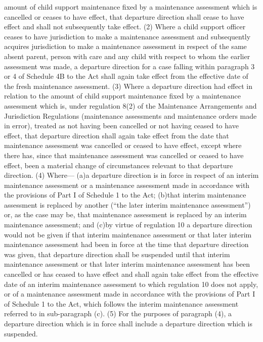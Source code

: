 \documentclass[a4paper]{article}
\begin{document}
amount of child support maintenance fixed by a maintenance assessment which is
cancelled or ceases to have effect, that departure direction shall cease to have
effect and shall not subsequently take effect.
(2) Where a child support officer ceases to have jurisdiction to make a
maintenance assessment and subsequently acquires jurisdiction to make a
maintenance assessment in respect of the same absent parent, person with care
and any child with respect to whom the earlier assessment was made, a departure
direction for a case falling within paragraph 3 or 4 of Schedule 4B to the Act
shall again take effect from the effective date of the fresh maintenance
assessment.
(3) Where a departure direction had effect in relation to the amount of child
support maintenance fixed by a maintenance assessment which is, under regulation
8(2) of the Maintenance Arrangements and Jurisdiction Regulations (maintenance
assessments and maintenance orders made in error), treated as not having been
cancelled or not having ceased to have effect, that departure direction shall
again take effect from the date that maintenance assessment was cancelled or
ceased to have effect, except where there has, since that maintenance assessment
was cancelled or ceased to have effect, been a material change of circumstances
relevant to that departure direction.
(4) Where—
(a)a departure direction is in force in respect of an interim maintenance
assessment or a maintenance assessment made in accordance with the provisions of
Part I of Schedule 1 to the Act;
(b)that interim maintenance assessment is replaced by another (“the later
interim maintenance assessment”) or, as the case may be, that maintenance
assessment is replaced by an interim maintenance assessment; and
(c)by virtue of regulation 10 a departure direction would not be given if that
interim maintenance assessment or that later interim maintenance assessment had
been in force at the time that departure direction was given, that departure
direction shall be suspended until that interim maintenance assessment or that
later interim maintenance assessment has been cancelled or has ceased to have
effect and shall again take effect from the effective date of an interim
maintenance assessment to which regulation 10 does not apply, or of a
maintenance assessment made in accordance with the provisions of Part I of
Schedule 1 to the Act, which follows the interim maintenance assessment referred
to in sub-paragraph (c).
(5) For the purposes of paragraph (4), a departure direction which is in force
shall include a departure direction which is suspended.
\end{document}

